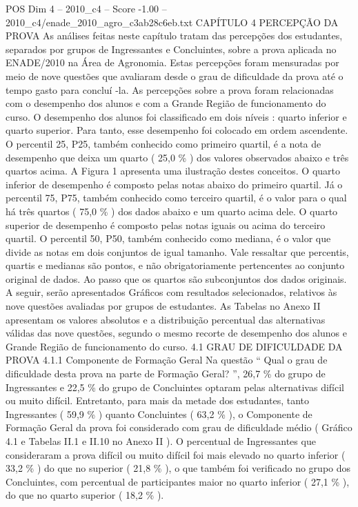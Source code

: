 \begin{textsample}{POS Dim 4 – 2010\_c4 – Score -1.00 – 2010\_c4/enade\_2010\_agro\_c3ab28c6eb.txt}  \label{ex:f4_pos_292}
CAPÍTULO 4 PERCEPÇÃO DA PROVA As análises feitas neste capítulo tratam das percepções dos estudantes, separados por grupos de Ingressantes e Concluintes, sobre a prova aplicada no ENADE/2010 na Área de Agronomia.
Estas percepções foram mensuradas por meio de nove questões que avaliaram desde o grau de dificuldade da prova até o tempo gasto para concluí -la.
As percepções sobre a prova foram relacionadas com o desempenho dos alunos e com a Grande Região de funcionamento do curso.
O desempenho dos alunos foi classificado em dois níveis : quarto inferior e quarto superior.
Para tanto, esse desempenho foi colocado em ordem ascendente.
O percentil 25, P25, também conhecido como primeiro quartil, é a nota de desempenho que deixa um quarto ( 25,0 \% ) dos valores observados abaixo e três quartos acima.
A Figura 1 apresenta uma ilustração destes conceitos.
O quarto inferior de desempenho é composto pelas notas abaixo do primeiro quartil.
Já o percentil 75, P75, também conhecido como terceiro quartil, é o valor para o qual há três quartos ( 75,0 \% ) dos dados abaixo e um quarto acima dele.
O quarto superior de desempenho é composto pelas notas iguais ou acima do terceiro quartil.
O percentil 50, P50, também conhecido como mediana, é o valor que divide as notas em dois conjuntos de igual tamanho.
Vale ressaltar que percentis, quartis e medianas são pontos, e não obrigatoriamente pertencentes ao conjunto original de dados.
Ao passo que os quartos são subconjuntos dos dados originais.
A seguir, serão apresentados Gráficos com resultados selecionados, relativos às nove questões avaliadas por grupos de estudantes.
As Tabelas no Anexo II apresentam os valores absolutos e a distribuição percentual das alternativas válidas das nove questões, segundo o mesmo recorte de desempenho dos alunos e Grande Região de funcionamento do curso. 4.1 GRAU DE DIFICULDADE DA PROVA 4.1.1 Componente de Formação Geral Na questão “ Qual o grau de dificuldade desta prova na parte de Formação Geral? ”, 26,7 \% do grupo de Ingressantes e 22,5 \% do grupo de Concluintes optaram pelas alternativas difícil ou muito difícil.
Entretanto, para mais da metade dos estudantes, tanto Ingressantes ( 59,9 \% ) quanto Concluintes ( 63,2 \% ), o Componente de Formação Geral da prova foi considerado com grau de dificuldade médio ( Gráfico 4.1 e Tabelas II.1 e II.10 no Anexo II ).
O percentual de Ingressantes que consideraram a prova difícil ou muito difícil foi mais elevado no quarto inferior ( 33,2 \% ) do que no superior ( 21,8 \% ), o que também foi verificado no grupo dos Concluintes, com percentual de participantes maior no quarto inferior ( 27,1 \% ), do que no quarto superior ( 18,2 \% ).

\end{textsample}

